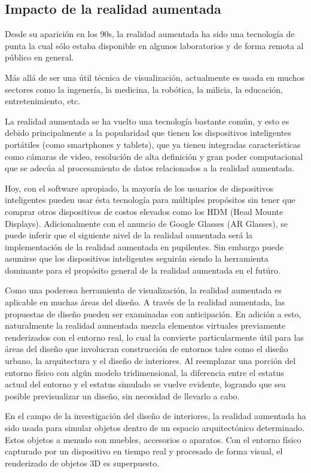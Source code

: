\subsection{Impacto de la realidad aumentada}
Desde su aparición en los 90s, la realidad aumentada ha sido una tecnología de punta la cual sólo estaba disponible en algunos laboratorios y de forma remota al público en general. \par
Más allá de ser una útil técnica de visualización, actualmente es usada en muchos sectores como la ingenería, la medicina, la robótica, la milicia, la educación, entretenimiento, etc.\par
La realidad aumentada se ha vuelto una tecnología bastante común, y esto es debido principalmente a la popularidad que tienen los dispositivos inteligentes portátiles (como smartphones y tablets), que ya tienen integradas características como cámaras de video, resolución de alta definición y gran poder computacional que se adecúa al procesamiento de datos relacionados a la realidad aumentada.\par
Hoy, con el software apropiado, la mayoría de los usuarios de dispositivos inteligentes pueden usar ésta tecnología para múltiples propósitos sin tener que comprar otros dispositivos de costos elevados como los HDM (Head Mounte Displays). Adicionalmente con el anuncio de Google Glasses (AR Glasses), se puede inferir que el siguiente nivel de la realidad aumentada será la implementación de la realidad aumentada en pupilentes. Sin embargo puede asumirse que los dispositivos inteligentes seguirán siendo la herramienta dominante para el propósito general de la realidad aumentada en el futúro.\par
Como una poderosa herramienta de visualización, la realidad aumentada es aplicable en muchas áreas del diseño. A través de la realidad aumentada, las propuestas de diseño pueden ser examinadas con anticipación. En adición a esto, naturalmente la realidad aumentada mezcla elementos virtuales previamente renderizados con el entorno real, lo cual la convierte particularmente útil para las áreas del diseño que involucran construcción de entornos tales como el diseño urbano, la arquitectura y el diseño de interiores. Al reemplazar una porción del entorno físico con algún modelo tridimensional, la diferencia entre el estatus actual del entorno y el estatus simulado se vuelve evidente, logrando que sea posible previsualizar un diseño, sin necesidad de llevarlo a cabo.\par
En el campo de la investigación del diseño de interiores, la realidad aumentada ha sido usada para simular objetos dentro de un espacio arquitectónico determinado. Estos objetos a menudo son muebles, accesorios o aparatos. Con el entorno físico capturado por un dispositivo en tiempo real y procesado de forma visual, el renderizado de objetos 3D es superpuesto.\cite{B15}

